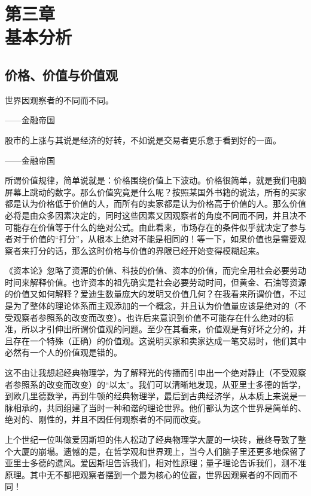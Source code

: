 \section[第三章\q 基本分析]{第三章\\ 基本分析}

\subsection{价格、价值与价值观}

{\kaishu
世界因观察者的不同而不同。

\hfill ——金融帝国

股市的上涨与其说是经济的好转，不如说是交易者更乐意于看到好的一面。

\hfill ——金融帝国
}

所谓价值规律，简单说就是：价格围绕价值上下波动。价格很简单，就是我们电脑屏幕上跳动的数字。那么价值究竟是什么呢？按照某国外书籍的说法，所有的买家都是认为价格低于价值的人，而所有的卖家都是认为价格高于价值的人。那么价值必将是由众多因素决定的，同时这些因素又因观察者的角度不同而不同，并且决不可能存在价值等于什么的绝对公式。由此看来，市场存在的条件似乎就决定了参与者对于价值的“打分”，从根本上绝对不能是相同的！等一下，如果价值也是需要观察者来打分的话，那么这时价格与价值的界限已经开始变得模糊起来。

《资本论》忽略了资源的价值、科技的价值、资本的价值，而完全用社会必要劳动时间来解释价值。也许资本的祖先确实是社会必要劳动时间，但黄金、石油等资源的价值又如何解释？爱迪生数量庞大的发明又价值几何？在我看来所谓价值，不过是为了整体的理论体系而主观添加的一个概念，并且认为价值量应该是绝对的（不受观察者参照系的改变而改变）。也许后来意识到价值不可能存在什么绝对的标准，所以才引伸出所谓价值观的问题。至少在其看来，价值观是有好坏之分的，并且存在一个特殊（正确）的价值观。这说明买家和卖家达成一笔交易时，他们其中必然有一个人的价值观是错的。

这不由让我想起经典物理学，为了解释光的传播而引申出一个绝对静止（不受观察者参照系的改变而改变）的“以太”。我们可以清晰地发现，从亚里士多德的哲学，到欧几里德数学，再到牛顿的经典物理学，最后到古典经济学，从本质上来说是一脉相承的，共同组建了当时一种和谐的理论世界。他们都认为这个世界是简单的、绝对的、刚性的，并且不因任何观察者的不同而改变。

上个世纪一位叫做爱因斯坦的伟人松动了经典物理学大厦的一块砖，最终导致了整个大厦的崩塌。遗憾的是，在哲学观和世界观上，当今人们脑子里还更多地保留了亚里士多德的遗风。爱因斯坦告诉我们，相对性原理；量子理论告诉我们，测不准原理。其中无不都把观察者摆到一个最为核心的位置，世界因观察者的不同而不同！


